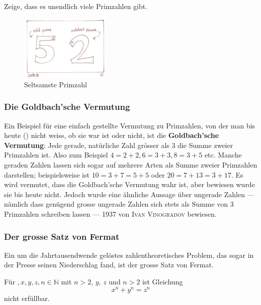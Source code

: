\documentclass[%
11pt,%
twoside,%
titlepage,%
german,%
headsepline%
]{scrartcl}
\begin{document}
\begin{ueb}
    Zeige, dass es unendlich viele Primzahlen gibt.
\end{ueb}
 
\begin{figure}
\begin{center}
\includegraphics[width=0.3828\textwidth]{pictures/primzahl}
\caption{Seltsamste Primzahl}
\end{center}
\end{figure}
 
\subsubsection{Die Goldbach'sche Vermutung}
Ein Beispiel für eine einfach gestellte Vermutung zu Primzahlen, von der man bis heute (\the\year) nicht weiss, ob sie war ist oder nicht, ist die \textbf{Goldbach'sche Vermutung}: Jede gerade, natürliche Zahl grösser als $3$ die Summe zweier Primzahlen ist. Also zum Beispiel $4=2+2, 6=3+3, 8=3+5$ etc. Manche geraden Zahlen lassen sich sogar auf mehrere Arten als Summe zweier Primzahlen darstellen; beispielsweise ist $10=3+7=5+5$ oder $20=7+13=3+17$. Es wird vermutet, dass die Goldbach'sche Vermutung wahr ist, aber bewiesen wurde sie bis heute nicht. Jedoch wurde eine ähnliche Aussage über ungerade Zahlen --- nämlich dass genügend grosse ungerade Zahlen sich stets als Summe von $3$ Primzahlen schreiben lassen --- 1937 von \textsc{Ivan Vinogradov} bewiesen.
 
\subsubsection{Der grosse Satz von Fermat}
 
Ein um die Jahrtausendwende gelöstes zahlentheoretisches Problem, das sogar in der Presse seinen Niederschlag fand, ist der grosse Satz von Fermat.
\begin{csatz}{}
Für $,x,y,z,n\in\mathbb{N}$ mit $n>2$, $y$, $z$ und $n>2$ ist Gleichung
$$x^n+y^n=z^n$$
nicht erfüllbar.
\end{csatz}
\end{document}
